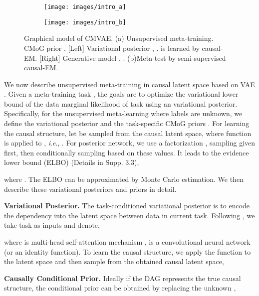 \documentclass[letterpaper]{article} \usepackage{aaai23}  \usepackage{times}  \usepackage{helvet}  \usepackage{courier}  \usepackage[hyphens]{url}  \usepackage{graphicx} \urlstyle{rm} \def\UrlFont{\rm}  \usepackage{natbib}  \usepackage{caption} \frenchspacing  \setlength{\pdfpagewidth}{8.5in}  \setlength{\pdfpageheight}{11in}  \usepackage{algorithm}
\newcommand{\ie}{\textit{i}.\textit{e}.}
\theoremstyle{plain}
\theoremstyle{definition}
\theoremstyle{remark}
\begin{document}
\begin{figure}[t]
	\centering
	\begin{subfigure}{.27\textwidth}
		\centering
		\texttt{[image: images/intro\_a]}
		\caption{}
		\label{fig:intro_a}
	\end{subfigure}
	\hfill
	\begin{subfigure}{.147\textwidth}
		\centering
		\texttt{[image: images/intro\_b]}
		\caption{}
		\label{fig:intro_b}
	\end{subfigure}	
\caption{Graphical model of CMVAE. (a) Unsupervised meta-training. CMoG prior . [Left] Variational posterior , .  is learned by causal-EM. [Right] Generative
		model , . 
		(b)Meta-test by semi-supervised causal-EM. } 
	\label{fig:cmvae}


\end{figure}  


We now describe unsupervised meta-training in causal latent space based on VAE \cite{Kingma2014vae}.  Given a meta-training task , the goals are to optimize the variational lower bound of the data marginal likelihood of task  using an variational posterior. 
Specifically, for the unsupervised meta-learning where labels are unknown, we define the variational posterior  and the task-specific CMoG priors .  For learning the causal structure, let  be sampled from the causal latent space, where function  is applied to , \ie,   . For posterior network, we use a factorization , sampling  given  first, then conditionally sampling  based on these values. It leads to the evidence lower bound (ELBO) (Details in Supp. 3.3),

where . The ELBO can be approximated by Monte Carlo estimation. We then describe these variational posteriors and priors in detail. 


\noindent\textbf{Variational Posterior.}
The task-conditioned variational posterior  is to encode the dependency into the latent space between data in current task. Following \cite{lee2021metagmvae}, we take task  as inputs and denote,
 
where  is multi-head self-attention mechanism \cite{vaswani2017attention},  is a convolutional neural network (or an identity function). To learn the causal structure, we apply the function  to the latent space and then sample  from the obtained causal latent space, 






\noindent\textbf{Causally Conditional Prior.}
Ideally if the DAG  represents the true causal structure, the conditional prior  can be obtained by replacing the unknown ,
	 
\end{document}
